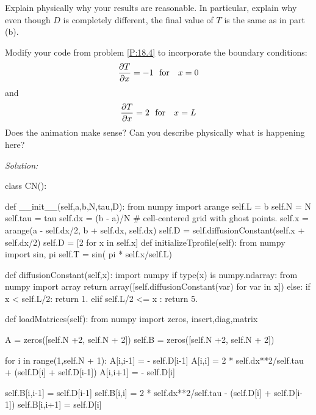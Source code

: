 {\begin{enumerate}
\begin{enumerate}
\subprob \label{P:18.4b}   Explain physically why your results are reasonable. In particular,
    explain why even though $D$ is completely different, the final
    value of $T$ is the same as in part (b).
\end{enumerate}
\prob Modify your code from problem \ref{P:18.4} to incorporate the
boundary conditions: 
\begin{equation}
{\partial T
    \over \partial x} = -1 \mathrm{~~ for~~~} x = 0
\end{equation}
and
\begin{equation}
{\partial T
    \over \partial x} = 2 \mathrm{~~ for~~~} x = L
\end{equation}
Does the animation make sense?  Can you describe physically what is
happening here?
\end{enumerate}
\ifsolutions
\textit{Solution:}\\
\begin{codeexample}
\begin{VerbatimOut}{\listingFile}


class CN():

    def __init__(self,a,b,N,tau,D):
        from numpy import arange
        self.L = b
        self.N = N
        self.tau = tau
        self.dx = (b - a)/N
        # cell-centered grid with ghost points.
        self.x = arange(a - self.dx/2, b + self.dx, self.dx)
        self.D = self.diffusionConstant(self.x + self.dx/2)
        self.D = [2 for x in self.x]
    def initializeTprofile(self):
        from numpy import sin, pi
        self.T = sin( pi * self.x/self.L)

    def diffusionConstant(self,x):
        import numpy
        if type(x) is numpy.ndarray:
            from numpy import array
            return array([self.diffusionConstant(var) for var in x])
        else:
            if x < self.L/2:
                return 1.
            elif self.L/2 <= x :
                return 5.


    def loadMatrices(self):
        from numpy import zeros, insert,diag,matrix

        A = zeros([self.N +2, self.N + 2])
        self.B = zeros([self.N +2, self.N + 2])

        for i in range(1,self.N + 1):
            A[i,i-1] = - self.D[i-1]
            A[i,i] = 2 * self.dx**2/self.tau  + (self.D[i] + self.D[i-1])
            A[i,i+1] = - self.D[i]

            self.B[i,i-1] = self.D[i-1]
            self.B[i,i] = 2 * self.dx**2/self.tau  - (self.D[i] + self.D[i-1])
            self.B[i,i+1] = self.D[i]


\end{VerbatimOut}
\end{codeexample}}
